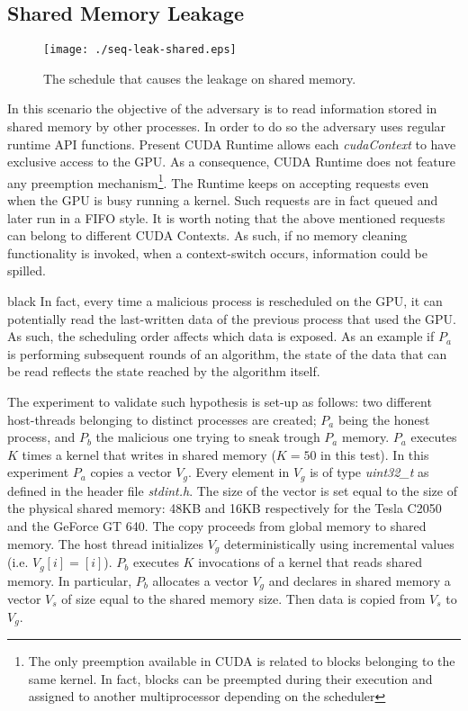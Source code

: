 \documentclass[11pt,onecolumn,letterpaper]{IEEEtran}
\newcommand{\clr}{black}
\begin{document}
\subsection{Shared Memory Leakage}
\label{sub:shmem_attack}

\begin{figure}[t]
\begin{center}
	\texttt{[image: ./seq-leak-shared.eps]}
	\caption{The schedule that causes the leakage on shared memory.}
	\label{fig:shmemmem_attack}
\end{center}
\end{figure}

In this scenario the objective of the adversary is to read information stored in shared memory by other processes.
In order to do so the adversary uses regular runtime API functions. Present CUDA Runtime allows each \emph{cudaContext} to have exclusive access to the GPU. 
As a consequence, CUDA Runtime does not feature any preemption mechanism\footnote{The only preemption available in CUDA is related to blocks belonging to the same kernel.
In fact, blocks can be preempted during their execution and assigned to another multiprocessor depending on the scheduler}.
The Runtime keeps on accepting requests even when the GPU is busy running a kernel. 
Such requests are in fact queued and later run in a FIFO style.
It is worth noting that the above mentioned requests can belong to different CUDA Contexts.
As such, if no memory cleaning functionality is invoked, when a context-switch occurs, information could be spilled.

\begin{color}{\clr}
\label{leakagequality} 
In fact, every time a malicious process is rescheduled on the GPU, 
it can potentially read the last-written data of the previous process that used the GPU. 
As such, the scheduling order affects which data is exposed.
As an example if $P_a$ is performing subsequent rounds of an algorithm,
the state of the data that can be read reflects the state reached by the algorithm itself.
\end{color}

The experiment to validate such hypothesis is set-up as follows:
two different host-threads belonging to distinct processes are created;
$P_a$ being the honest process, and $P_b$ the malicious one trying to sneak trough $P_a$ memory.
$P_a$ executes $K$ times a kernel that writes in shared memory ($K=50$ in this test).
In this experiment $P_a$ copies a vector $V_g$.
Every element in $V_g$ is of type \emph{uint32\_t} as defined in the header file \emph{stdint.h}.
The size of the vector is set equal to the size of the physical shared memory:
48KB and 16KB respectively for the Tesla C2050 and the GeForce GT 640.
The copy proceeds from global memory to shared memory. 
The host thread initializes $V_g$ deterministically using incremental values (i.e. $V_g[i] = [i]$).
$P_b$ executes $K$ invocations of a kernel that reads shared memory. 
In particular, $P_b$ allocates a vector $V_g$ and declares in shared memory a vector $V_s$ of size equal to the shared memory size.
Then data is copied from $V_s$ to $V_g$.
\end{document}
